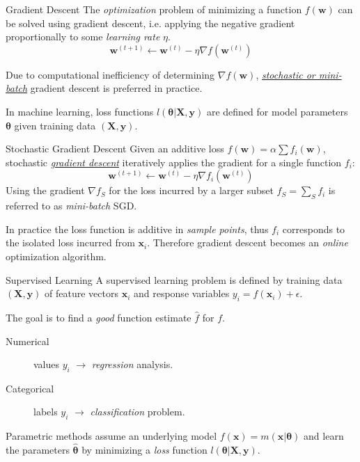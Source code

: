 \documentclass{cognito}
\begin{document}
\begin{note}{Gradient Descent}
	The \emph{optimization} problem of minimizing a function $f(\bm w)$ can be solved
	using gradient descent, i.e. applying the negative gradient
	proportionally to some \emph{learning rate} $\eta$.
	$$
		\bm w^{(t+1)} \leftarrow \bm w^{(t)} - \eta \nabla f(\bm w^{(t)})
	$$
	\begin{remark} Due to computational inefficiency of determining $\nabla f(\bm w)$,
		\hyperref[note:Stochastic Gradient Descent]{\it stochastic or mini-batch} gradient descent
		is preferred in practice. \end{remark}
	\begin{remark} In machine learning, loss functions $l(\bm\theta \vert \bm X, \bm y)$ are defined for model parameters $\bm \theta$
		given training data $(\bm X, \bm y)$.\end{remark}
	\vspace{-5pt}
\end{note}

\begin{note}{Stochastic Gradient Descent}
	Given an additive loss $f(\bm w) = \alpha \sum f_i (\bm w)$,
	stochastic \hyperref[note:Gradient Descent]{\it gradient descent} iteratively applies the gradient for a single function $f_i$:
	$$
		\bm w^{(t+1)} \leftarrow \bm w^{(t)} - \eta \nabla f_i(\bm w^{(t)})
	$$
	Using the gradient $\nabla f_S$ for the loss incurred by a larger subset $f_S = \sum_{S} f_i$ is referred to as \emph{mini-batch} SGD.
	\begin{remark}
		In practice the loss function is additive in \emph{sample points},
		thus $f_i$ corresponds to the isolated loss incurred from $\bm x_i$.
		Therefore gradient descent becomes an \emph{online} optimization algorithm.
	\end{remark}
	\vspace{-5pt}
\end{note}

\begin{note}{Supervised Learning}
	A supervised learning problem is defined by training data $(\bm X, \bm y)$ of
	feature vectors $\bm x_i$ and response variables $y_i = f(\bm x_i) + \epsilon$.
	\begin{mdframed}[linecolor=black!25!white]
		The goal is to find a \emph{good} function estimate $\hat f$ for $f$.
	\end{mdframed}
	\begin{description}
		\item[Numerical] values $y_i$ $\longrightarrow$ \emph{regression} analysis.
		\item[Categorical] labels $y_i$ $\longrightarrow$ \emph{classification} problem.
	\end{description}
	
	Parametric methods assume an underlying model
	$f(\bm x) = m(\bm x \vert \bm \theta)$ and learn the parameters $\hat{\bm \theta}$
	by minimizing a \emph{loss} function $l(\bm \theta \vert \bm X, \bm y)$.
	
\end{note}
\end{document}
